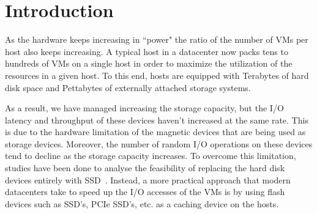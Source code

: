 
%
%

\section{Introduction}
As the hardware keeps increasing in ``power" the ratio of the number of VMs per host also keeps increasing. A typical host in a datacenter now packs tens to hundreds of VMs on a single host in order to maximize the utilization of the resources in a given host. To this end, hosts are equipped with Terabytes of hard disk space and Pettabytes of externally attached storage systems.

As a result, we have managed increasing the storage capacity, but the I/O latency and throughput of these devices haven't increased at the same rate. This is due to the hardware limitation of the magnetic devices that are being used as storage devices. Moreover, the number of random I/O operations on these devices tend to decline as the storage capacity increases. To overcome this limitation, studies have been done to analyse the feasibility of replacing the hard disk devices entirely with SSD~\cite{narayanan_migrating_2009}. Instead, a more practical approach that modern datacenters take to speed up the I/O accesses of the VMs is by using flash devices such as SSD's, PCIe SSD's, etc. as a caching device on the hosts.


